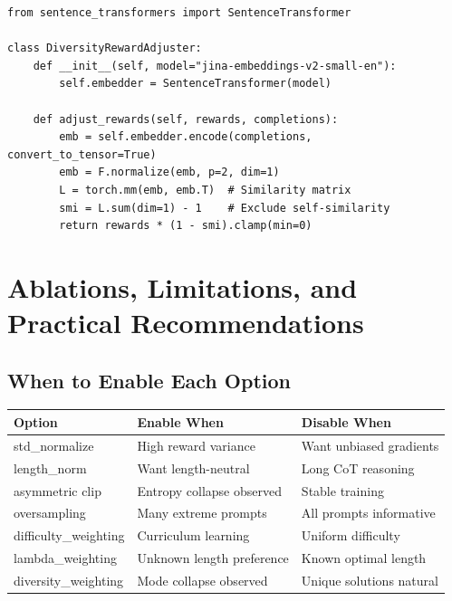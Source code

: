 \documentclass[11pt,a4paper]{article}
\begin{document}
\begin{lstlisting}
from sentence_transformers import SentenceTransformer

class DiversityRewardAdjuster:
    def __init__(self, model="jina-embeddings-v2-small-en"):
        self.embedder = SentenceTransformer(model)
    
    def adjust_rewards(self, rewards, completions):
        emb = self.embedder.encode(completions, convert_to_tensor=True)
        emb = F.normalize(emb, p=2, dim=1)
        L = torch.mm(emb, emb.T)  # Similarity matrix
        smi = L.sum(dim=1) - 1    # Exclude self-similarity
        return rewards * (1 - smi).clamp(min=0)
\end{lstlisting}

\newpage


\section{Ablations, Limitations, and Practical Recommendations}

\subsection{When to Enable Each Option}

\begin{center}
\begin{tabular}{@{}lll@{}}
\toprule
\textbf{Option} & \textbf{Enable When} & \textbf{Disable When} \\
\midrule
std\_normalize & High reward variance & Want unbiased gradients \\
length\_norm & Want length-neutral & Long CoT reasoning \\
asymmetric clip & Entropy collapse observed & Stable training \\
oversampling & Many extreme prompts & All prompts informative \\
difficulty\_weighting & Curriculum learning & Uniform difficulty \\
lambda\_weighting & Unknown length preference & Known optimal length \\
diversity\_weighting & Mode collapse observed & Unique solutions natural \\
\bottomrule
\end{tabular}
\end{center}
\end{document}
